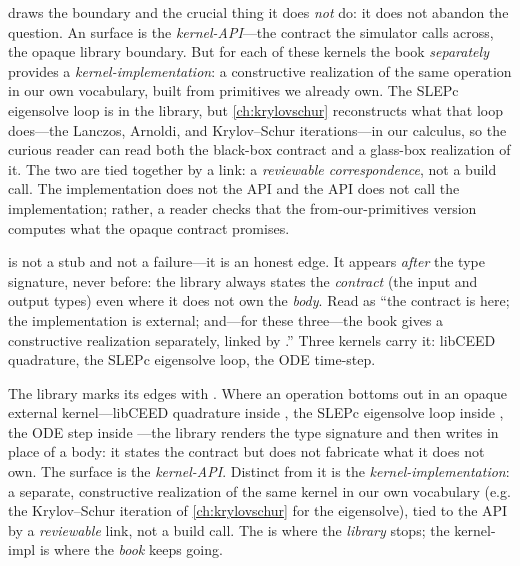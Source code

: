  draws the boundary and the crucial thing it does \emph{not} do:
it does not abandon the question. An  surface is the
\emph{kernel-API}---the contract the simulator calls across, the opaque library
boundary. But for each of these kernels the book \emph{separately} provides a
\emph{kernel-implementation}: a constructive realization of the same operation in
our own vocabulary, built from primitives we already own. The SLEPc eigensolve loop
is  in the library, but \cref{ch:krylovschur} reconstructs what that
loop does---the Lanczos, Arnoldi, and Krylov--Schur iterations---in our calculus, so
the curious reader can read both the black-box contract and a glass-box realization
of it. The two are tied together by a  link: a
\emph{reviewable correspondence}, not a build call. The implementation does not
 the API and the API does not call the implementation; rather, a
reader checks that the from-our-primitives version computes what the opaque contract
promises.

\begin{notationbox}
 is not a stub and not a failure---it is an honest edge. It
appears \emph{after} the type signature, never before: the library always states the
\emph{contract} (the input and output types) even where it does not own the
\emph{body}. Read  as ``the contract is here; the implementation is
external; and---for these three---the book gives a constructive realization
separately, linked by .'' Three kernels carry it: libCEED
quadrature, the SLEPc eigensolve loop, the ODE time-step.
\end{notationbox}

\begin{keyidea}
The library marks its edges with . Where an operation bottoms out in
an opaque external kernel---libCEED quadrature inside , the SLEPc
eigensolve loop inside , the ODE step inside ---the
library renders the type signature and then writes  in place of
a body: it states the contract but does not fabricate what it does not own. The
 surface is the \emph{kernel-API}. Distinct from it is the
\emph{kernel-implementation}: a separate, constructive realization of the same kernel
in our own vocabulary (e.g. the Krylov--Schur iteration of \cref{ch:krylovschur} for
the eigensolve), tied to the API by a \emph{reviewable} 
link, not a build call. The  is where the \emph{library} stops; the
kernel-impl is where the \emph{book} keeps going.
\end{keyidea}


